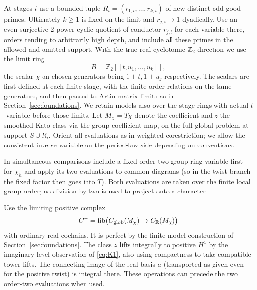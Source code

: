 At stages \(i\) use a bounded tuple \(R_i=(r_{1,i},\ldots,r_{k,i})\) of new distinct odd good primes. Ultimately \(k\ge1\) is fixed on the limit and \(r_{j,i}\to1\) dyadically. Use an even surjective \(2\)-power cyclic quotient of conductor \(r_{j,i}\) for each variable there, orders tending to arbitrarily high depth, and include all these primes in the allowed and omitted support. With the true real cyclotomic \(\mathbb Z_2\)-direction we use the limit ring
\[
                       B=\mathbb Z_2[[t,u_1,\ldots,u_k]],
\]
the scalar \(\chi\) on chosen generators being \(1+t,1+u_j\) respectively. The scalars are first defined at each finite stage, with the finite-order relations on the tame generators, and then passed to Artin matrix limits as in Section~\ref{sec:foundations}. We retain models also over the stage rings with actual \(t\)-variable before those limits. Let \(M_\chi=T\chi\) denote the coefficient and \(z\) the smoothed Kato class via the group-coefficient map, on the full global problem at support \(S\cup R_i\). Orient all evaluations as in weighted corestriction; we allow the consistent inverse variable on the period-law side depending on conventions. 

In simultaneous comparisons include a fixed order-two group-ring variable first for \(\chi_h\) and apply its two evaluations to common diagrams (so in the twist branch the fixed factor then goes into \(T\)). Both evaluations are taken over the finite local group order; no division by two is used to project onto a character.

Use the limiting positive complex
\[
 C^+=\mathrm{fib}\big(C_{\rm glob}(M_\chi)\to C_{\mathbb R}(M_\chi)\big)
\]
with ordinary real cochains. It is perfect by the finite-model construction of Section~\ref{sec:foundations}. The class \(z\) lifts integrally to positive \(H^1\) by the imaginary level observation of \eqref{eq:K1}, also using compactness to take compatible tower lifts. The connecting image of the real basis \(a\) (transported as given even for the positive twist) is integral there. These operations can precede the two order-two evaluations when used.

